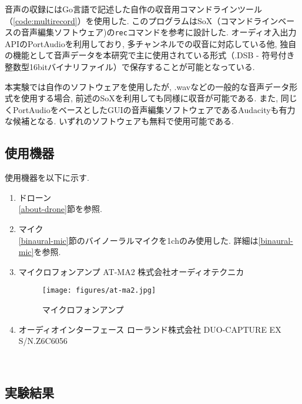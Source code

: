 音声の収録にはGo言語で記述した自作の収音用コマンドラインツール（\ref{code:multirecord}）を使用した. 
このプログラムはSoX（コマンドラインベースの音声編集ソフトウェア)\cite{sox:online}の\texttt{rec}コマンドを参考に設計した. 
オーディオ入出力APIのPortAudio\cite{portaudio:online}を利用しており, 多チャンネルでの収音に対応している他, 独自の機能として音声データを本研究で主に使用されている形式（.DSB - 符号付き整数型16bitバイナリファイル）で保存することが可能となっている. 

本実験では自作のソフトウェアを使用したが, .wavなどの一般的な音声データ形式を使用する場合, 前述のSoXを利用しても同様に収音が可能である. また, 同じくPortAudioをベースとしたGUIの音声編集ソフトウェアであるAudacity\cite{audacity:online}も有力な候補となる. いずれのソフトウェアも無料で使用可能である. 

\subsection{使用機器}\label{used-equipments-drone}

使用機器を以下に示す. 

\begin{enumerate}
\renewcommand{\labelenumi}{(\arabic{enumi})}
\item
  ドローン\\
  \ref{about-drone}節を参照. 
\item
  マイク \\
  \ref{binaural-mic}節のバイノーラルマイクを1chのみ使用した. 詳細は\ref{binaural-mic}を参照. 
\item
  マイクロフォンアンプ AT-MA2 株式会社オーディオテクニカ
  \begin{figure}[H]
  \centering
  \texttt{[image: figures/at-ma2.jpg]}
  \caption{マイクロフォンアンプ}
  \label{fig:at-ma2}
  \end{figure}

\item
  オーディオインターフェース ローランド株式会社 DUO-CAPTURE EX S/N.Z6C6056
  \cite{audio_interface:online}
\end{enumerate}

\
\subsection{実験結果}\label{result-drone}

